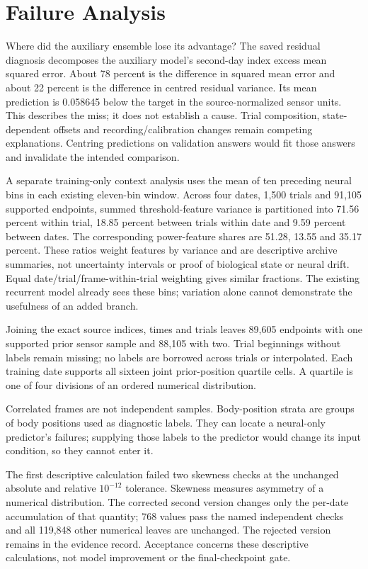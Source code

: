 \section{Failure Analysis}

Where did the auxiliary ensemble lose its advantage? The saved residual diagnosis decomposes the auxiliary model's second-day index
excess mean squared error. About 78 percent is the difference in squared mean
error and about 22 percent is the difference in centred residual variance.
Its mean prediction is 0.058645 below the target in the source-normalized
sensor units. This describes the miss; it does not establish a cause. Trial
composition, state-dependent offsets and recording/calibration changes remain
competing explanations. Centring predictions on validation answers would fit
those answers and invalidate the intended comparison.

A separate training-only context analysis uses the mean of ten preceding neural
bins in each existing eleven-bin window. Across four dates, 1,500 trials and
91,105 supported endpoints, summed threshold-feature variance is partitioned
into 71.56 percent within trial, 18.85 percent between trials within date and
9.59 percent between dates. The corresponding power-feature shares are
51.28, 13.55 and 35.17 percent. These ratios weight features by variance and
are descriptive archive summaries, not uncertainty intervals or proof of
biological state or neural drift. Equal date/trial/frame-within-trial weighting
gives similar fractions. The existing recurrent model already sees these bins;
variation alone cannot demonstrate the usefulness of an added branch.

Joining the exact source indices, times and trials leaves 89,605 endpoints with one supported prior sensor sample and 88,105 with two. Trial beginnings without labels remain missing; no labels are borrowed across trials or interpolated. Each training date supports all sixteen joint prior-position quartile cells. A quartile is one of four divisions of an ordered numerical distribution.

Correlated frames are not independent samples. Body-position strata are groups of body positions used as diagnostic labels. They can locate a neural-only predictor's failures; supplying those labels to the predictor would change its input condition, so they cannot enter it.

The first descriptive calculation failed two skewness checks at the unchanged
absolute and relative $10^{-12}$ tolerance. Skewness measures asymmetry of a
numerical distribution. The corrected second version changes only the
per-date accumulation of that quantity; 768 values pass the named independent
checks and all 119,848 other numerical leaves are unchanged. The rejected
version remains in the evidence record. Acceptance concerns these descriptive
calculations, not model improvement or the final-checkpoint gate.

